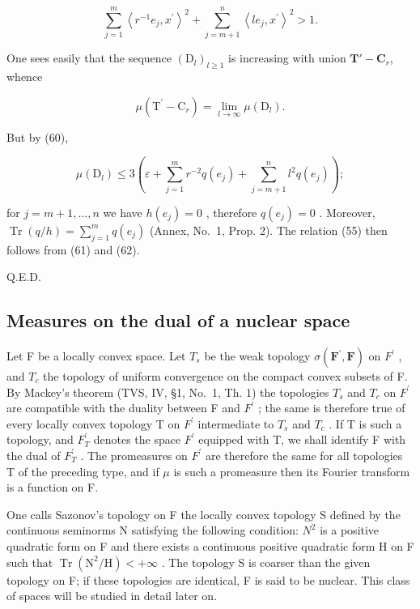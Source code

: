 \[
\sum_ {j = 1} ^ {m} \left\langle r ^ {- 1} e _ {j}, x ^ {\prime} \right\rangle^ {2} + \sum_ {j = m + 1} ^ {n} \left\langle l e _ {j}, x ^ {\prime} \right\rangle^ {2} > 1.
\]

One sees easily that the sequence \((\mathrm{D}_l)_{l\geqslant 1}\) is increasing with union \(\mathbf{T}' - \mathbf{C}_r\), whence

\[
\mu (\mathrm{T} ^ {\prime} - \mathrm{C} _ {r}) = \lim _ {l \to \infty} \mu (\mathrm{D} _ {l}).\tag{61}
\]

But by (60),

\[
\mu \left(\mathrm{D} _ {l}\right) \leqslant 3 \left(\varepsilon + \sum_ {j = 1} ^ {m} r ^ {- 2} q \left(e _ {j}\right) + \sum_ {j = m + 1} ^ {n} l ^ {2} q \left(e _ {j}\right)\right);\tag{62}
\]

for \(j = m + 1, \ldots, n\) we have \(h(e_j) = 0\) , therefore \(q(e_j) = 0\) . Moreover, \(\operatorname{Tr}(q/h) = \sum_{j=1}^{m} q(e_j)\) (Annex, No.~1, Prop. 2). The relation (55) then follows from (61) and (62).

Q.E.D.

\subsection{Measures on the dual of a nuclear space}

Let F be a locally convex space. Let \(T_{s}\) be the weak topology \(\sigma(\mathbf{F}^{\prime},\mathbf{F})\) on \(F^{\prime}\) , and \(T_{c}\) the topology of uniform convergence on the compact convex subsets of F. By Mackey's theorem (TVS, IV, §1, No.~1, Th. 1) the topologies \(T_{s}\) and \(T_{c}\) on \(F^{\prime}\) are compatible with the duality between F and \(F^{\prime}\) ; the same is therefore true of every locally convex topology T on \(F^{\prime}\) intermediate to \(T_{s}\) and \(T_{c}\) . If T is such a topology, and \(F^{\prime}_{T}\) denotes the space \(F^{\prime}\) equipped with T, we shall identify F with the dual of \(F^{\prime}_{T}\) . The promeasures on \(F^{\prime}\) are therefore the same for all topologies T of the preceding type, and if \(\mu\) is such a promeasure then its Fourier transform is a function on F.

One calls Sazonov's topology on F the locally convex topology S defined by the continuous seminorms N satisfying the following condition: \(N^{2}\) is a positive quadratic form on F and there exists a continuous positive quadratic form H on F such that \(\operatorname{Tr}\left(\mathrm{N}^{2}/\mathrm{H}\right)<+\infty\) . The topology S is coarser than the given topology on F; if these topologies are identical, F is said to be nuclear. This class of spaces will be studied in detail later on.

